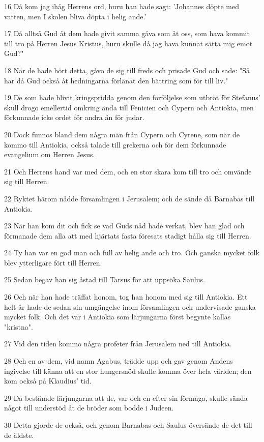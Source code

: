 \par 16 Då kom jag ihåg Herrens ord, huru han hade sagt: 'Johannes döpte med vatten, men I skolen bliva döpta i helig ande.'
\par 17 Då alltså Gud åt dem hade givit samma gåva som åt oss, som hava kommit till tro på Herren Jesus Kristus, huru skulle då jag hava kunnat sätta mig emot Gud?"
\par 18 När de hade hört detta, gåvo de sig till freds och prisade Gud och sade: "Så har då Gud också åt hedningarna förlänat den bättring som för till liv."
\par 19 De som hade blivit kringspridda genom den förföljelse som utbröt för Stefanus' skull drogo emellertid omkring ända till Fenicien och Cypern och Antiokia, men förkunnade icke ordet för andra än för judar.
\par 20 Dock funnos bland dem några män från Cypern och Cyrene, som när de kommo till Antiokia, också talade till grekerna och för dem förkunnade evangelium om Herren Jesus.
\par 21 Och Herrens hand var med dem, och en stor skara kom till tro och omvände sig till Herren.
\par 22 Ryktet härom nådde församlingen i Jerusalem; och de sände då Barnabas till Antiokia.
\par 23 När han kom dit och fick se vad Guds nåd hade verkat, blev han glad och förmanade dem alla att med hjärtats fasta föresats stadigt hålla sig till Herren.
\par 24 Ty han var en god man och full av helig ande och tro. Och ganska mycket folk blev ytterligare fört till Herren.
\par 25 Sedan begav han sig åstad till Tarsus för att uppsöka Saulus.
\par 26 Och när han hade träffat honom, tog han honom med sig till Antiokia. Ett helt år hade de sedan sin umgängelse inom församlingen och undervisade ganska mycket folk. Och det var i Antiokia som lärjungarna först begynte kallas "kristna".
\par 27 Vid den tiden kommo några profeter från Jerusalem ned till Antiokia.
\par 28 Och en av dem, vid namn Agabus, trädde upp och gav genom Andens ingivelse till känna att en stor hungersnöd skulle komma över hela världen; den kom också på Klaudius' tid.
\par 29 Då bestämde lärjungarna att de, var och en efter sin förmåga, skulle sända något till understöd åt de bröder som bodde i Judeen.
\par 30 Detta gjorde de också, och genom Barnabas och Saulus översände de det till de äldste.


